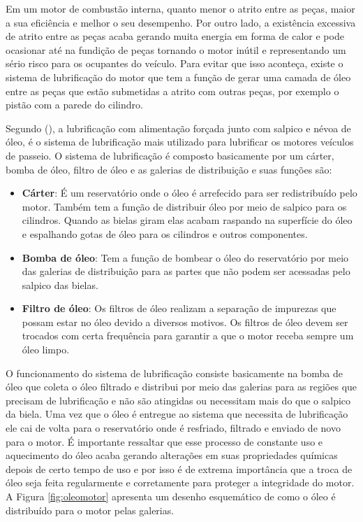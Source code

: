 	Em um motor de combustão interna, quanto menor o atrito entre as peças, maior a sua eficiência e melhor o seu desempenho. Por outro lado, a existência excessiva de atrito entre as peças acaba gerando muita energia em forma de calor e pode ocasionar até na fundição de peças tornando o motor inútil e representando um sério risco para os ocupantes do veículo. Para evitar que isso aconteça, existe o sistema de lubrificação do motor que tem a função de gerar uma camada de óleo entre as peças que estão submetidas a atrito com outras peças, por exemplo o pistão com a parede do cilindro.
	
	Segundo \citeauthor{bosch2004} (\citeyear{bosch2004}), a lubrificação com alimentação forçada junto com salpico e névoa de óleo, é o sistema de lubrificação mais utilizado para lubrificar os motores veículos de passeio. O sistema de lubrificação é composto basicamente por um cárter, bomba de óleo, filtro de óleo e as galerias de distribuição e suas funções são:
	
\begin{itemize}
	\item \textbf{Cárter}: É um reservatório onde o óleo é arrefecido para ser redistribuído pelo motor. Também tem a função de distribuir óleo por meio de salpico para os cilindros. Quando as bielas giram elas acabam raspando na superfície do óleo e espalhando gotas de óleo para os cilindros e outros componentes.
	\item \textbf{Bomba de óleo}: Tem a função de bombear o óleo do reservatório por meio das galerias de distribuição para as partes que não podem ser acessadas pelo salpico das bielas.
	\item \textbf{Filtro de óleo}: Os filtros de óleo realizam a separação de impurezas que possam estar no óleo devido a diversos motivos. Os filtros de óleo devem ser trocados com certa frequência para garantir a que o motor receba sempre um óleo limpo.
\end{itemize}

	O funcionamento do sistema de lubrificação consiste basicamente na bomba de óleo que coleta o óleo filtrado e distribui por meio das galerias para as regiões que precisam de lubrificação e não são atingidas ou necessitam mais do que o salpico da biela. Uma vez que o óleo é entregue ao sistema que necessita de lubrificação ele cai de volta para o reservatório onde é resfriado, filtrado e enviado de novo para o motor. É importante ressaltar que esse processo de constante uso e aquecimento do óleo acaba gerando alterações em suas propriedades químicas depois de certo tempo de uso e por isso é de extrema importância que a troca de óleo seja feita regularmente e corretamente para proteger a integridade do motor. A Figura \ref{fig:oleomotor} apresenta um desenho esquemático de como o óleo é distribuído para o motor pelas galerias.
	
